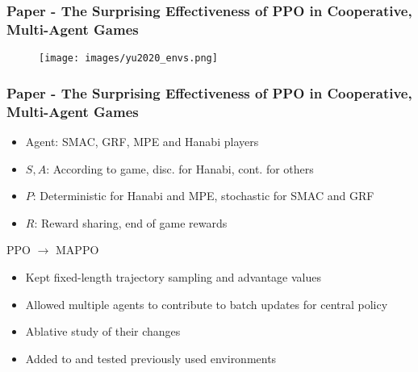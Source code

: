 \documentclass{beamer}
\begin{document}
\begin{frame} 
    \frametitle{Paper \thepapercounter - The Surprising Effectiveness of PPO in Cooperative, 
    Multi-Agent Games}
    \begin{description}\small
        \item[Environments:] 
    \end{description}
    \begin{figure}\small\vspace*{-1em}
        \texttt{[image: images/yu2020\_envs.png]}
    \end{figure}
\end{frame}

\begin{frame} 
    \frametitle{Paper \thepapercounter - The Surprising Effectiveness of PPO in Cooperative, 
    Multi-Agent Games}
    \begin{description}\small
        \item[Model:] 
        \begin{itemize} 
            \item Agent: SMAC, GRF, MPE and Hanabi players
            \item $S,A$: According to game, disc. for Hanabi, cont. for others
            \item $P$: Deterministic for Hanabi and MPE, stochastic for SMAC and GRF
            \item $R$: Reward sharing, end of game rewards
        \end{itemize}
        \item[Algorithm:] PPO\cite{schulman2017a} $\rightarrow$ MAPPO
        \begin{itemize}
            \item Kept fixed-length trajectory sampling and advantage values
            \item Allowed multiple agents to contribute to batch updates for central policy
        \end{itemize}
        \item[Strengths:]
        \begin{itemize}
            \item Ablative study of their changes
            \item Added to and tested previously used environments
        \end{itemize}
    \end{description}
\end{frame}
\end{document}
